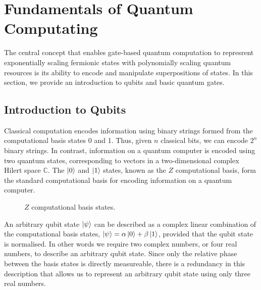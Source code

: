 \section{Fundamentals of Quantum Computating}%
\label{quantum-computation}

The central concept that enables gate-based quantum computation to represrent exponentially scaling fermionic states with polynomially scaling quantum resources is its ability to encode and manipulate superpositions of states. In this section, we provide an introduction to qubits and basic quantum gates.

\subsection{Introduction to Qubits}

Classical computation encodes information using binary strings formed from the computational basis states 0 and 1. Thus, given $n$ classical bits, we can encode $2^n$ binary strings. In contrast, information on a quantum computer is encoded using two quantum states, corresponding to vectors in a two-dimensional complex Hilert space $\mathbb{C}$. The $\ket 0$ and $\ket 1$ states, known as the $Z$ computational basis, form the standard computational basis for encoding information on a quantum computer.

\begin{figure}[H]
    \centering
    \begin{minipage}{.45\textwidth}
        \centering
    \end{minipage}%
    \begin{minipage}{0.45\textwidth}
        \centering
    \end{minipage}
    \caption{$Z$ computational basis states.}
    \label{z-eigenstates}
\end{figure}

An arbitrary qubit state $\ket\psi$ can be described as a complex linear combination of the computational basis states, $\ket\psi = \alpha\ket 0 + \beta\ket 1$, provided that the qubit state is normalised. In other words we require two complex numbers, or four real numbers, to describe an arbitrary qubit state. Since only the relative phase between the basis states is directly measureable, there is a redundancy in this description that allows us to represent an arbitrary qubit state using only three real numbers.

